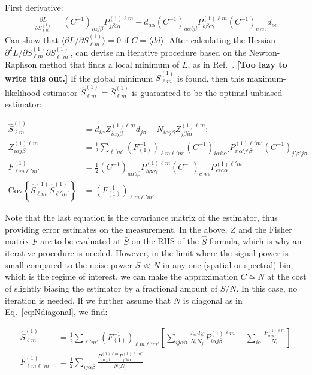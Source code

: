 \documentclass[prd,aps,10pt,nofootinbib,twocolumn,superscriptaddress,preprintnumbers,balancelastpage,longbibliography]{revtex4-1}
\newcommand{\Cinv}{(C^{-1})}
\newcommand{\blue}[1]{\textcolor{deepblue}{\bf #1}}
\begin{document}
First derivative:
\begin{align}
\frac{\partial L}{\partial S^{(1)}_{\ell m}} = \Cinv_{i \alpha j \beta} P^{(1) \ell m}_{j \beta i \alpha} - d_{a \alpha} \Cinv_{a \alpha b \beta} P^{(1) \ell m}_{b \beta c \gamma} \Cinv_{c \gamma e \epsilon} d_{e \epsilon}
\end{align}
Can show that $\langle {\partial L}/{\partial S^{(1)}_{\ell m}} \rangle = 0$ if $C = \langle d d \rangle$. After calculating the Hessian $ {\partial^2 L}/{\partial S^{(1)}_{\ell m} \partial S^{(1)}_{\ell' m'}}$, can devise an iterative procedure based on the Newton-Raphson method that finds a local minimum of $L$, as in Ref.~\cite{dahlen2008spectral}. \blue{[Too lazy to write this out.]} If the global minimum $\bar{S}^{(1)}_{\ell m}$ is found, then this maximum-likelihood estimator $\hat{S}^{(1)}_{\ell m} = \bar{S}^{(1)}_{\ell m}$ is guaranteed to be the optimal unbiased estimator:
\begin{widetext}
\begin{align}
\hat{S}^{(1)}_{\ell m} &= d_{i\alpha} Z^{(1) \ell m}_{i\alpha j \beta} d_{j \beta} - N_{i \alpha j \beta} Z^{(1) \ell m}_{j \beta i\alpha}; \\
Z^{(1) \ell m}_{i \alpha j \beta} &= \frac{1}{2} \sum_{\ell' m'} (F_{(1)}^{-1})_{\ell m \ell' m'} \Cinv_{i \alpha i' \alpha'} P^{(1) \ell' m'}_{i' \alpha' j' \beta'} \Cinv_{j' \beta' j \beta} \\
F^{(1)}_{\ell m \ell' m'} &= \frac{1}{2} \Cinv_{a \alpha b \beta} P^{(1) \ell m}_{b \beta c \gamma} \Cinv_{c \gamma e \epsilon} P^{(1) \ell' m'}_{e \epsilon a \alpha} \\
\text{Cov}\left\lbrace \hat{S}^{(1)}_{\ell m} \hat{S}^{(1)}_{\ell' m'} \right\rbrace &= (F_{(1)}^{-1})_{\ell m \ell' m'}
\end{align}
\end{widetext}

Note that the last equation is the covariance matrix of the estimator, thus providing error estimates on the measurement.
In the above, $Z$ and the Fisher matrix $F$ are to be evaluated at $\bar{S}$ on the RHS of the $\hat{S}$ formula, which is why an iterative procedure is needed. However, in the limit where the signal power is small compared to the noise power $S \ll N$ in any one (spatial or spectral) bin, which is the regime of interest, we can make the approximation $C \simeq N$ at the cost of slightly biasing the estimator by a fractional amount of $S/N$. In this case, no iteration is needed. If we further assume that $N$ is diagonal as in Eq.~\ref{eq:Ndiagonal}, we find:
\begin{widetext}
\begin{align}
\hat{S}^{(1)}_{\ell m} &= \frac{1}{2} \sum_{\ell' m'} (F_{(1)}^{-1})_{\ell m \ell' m'} \left[\sum_{i j \alpha \beta}  \frac{ d_{i \alpha} d_{j \beta}}{N_i N_j} P^{(1)\ell m}_{i \alpha j \beta} - \sum_{i \alpha}  \frac{P^{(1)\ell m}_{i \alpha i \alpha}}{N_i} \right] \\
F^{(1)}_{\ell m \ell' m'} &= \frac{1}{2} \sum_{i j \alpha \beta} \frac{P^{(1)\ell m}_{i \alpha j \beta} P^{(1)\ell' m'}_{j \beta i \alpha}}{N_i N_j}
\end{align}
\end{widetext}
\end{document}

